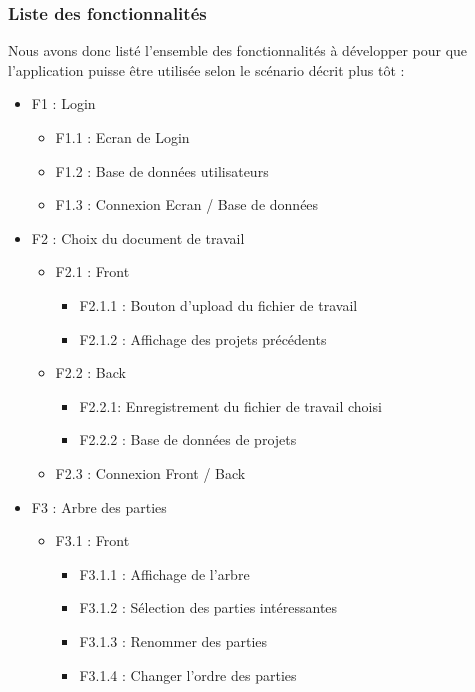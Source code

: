 \documentclass[12pt]{article}
\begin{document}
\subsubsection{Liste des fonctionnalités}
\noindent
Nous avons donc listé l'ensemble des fonctionnalités à développer pour que l'application puisse être utilisée selon le scénario décrit plus tôt :

\begin{itemize}
    \item F1 : Login
    \begin{itemize}
        \item F1.1 : Ecran de Login
        \item F1.2 : Base de données utilisateurs
        \item F1.3 : Connexion Ecran / Base de données
    \end{itemize}
    
    \item F2 : Choix du document de travail
    \begin{itemize}
        \item F2.1 : Front
        \begin{itemize}
            \item F2.1.1 : Bouton d'upload du fichier de travail
            \item F2.1.2 : Affichage des projets précédents
        \end{itemize}
        
        \item F2.2 : Back
        \begin{itemize}
            \item F2.2.1: Enregistrement du fichier de travail choisi
            \item F2.2.2 : Base de données de projets
        \end{itemize}
        \item F2.3 : Connexion Front / Back
    \end{itemize}
    
    
    \item F3 : Arbre des parties
    \begin{itemize}
        \item F3.1 : Front
        \begin{itemize}
            \item F3.1.1 : Affichage de l'arbre
            \item F3.1.2 : Sélection des parties intéressantes
            \item F3.1.3 : Renommer des parties
            \item F3.1.4 : Changer l'ordre des parties
        \end{itemize}
        

\end{itemize}
\end{itemize}
\end{document}
